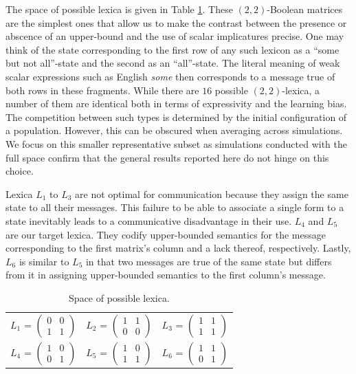 \documentclass[a4paper]{article}
\begin{document}
The space of possible lexica is given in Table \ref{tab:lexica}. These $(2,2)$-Boolean matrices are the simplest ones that allow us to make the contrast between the presence or abscence of an upper-bound and the use of scalar implicatures precise. One may think of the state corresponding to the first row of any such lexicon as a ``some but not all''-state and the second as an ``all''-state. The literal meaning of weak scalar expressions such as English {\em some} then corresponds to a message true of both rows in these fragments. While there are $16$ possible $(2,2)$-lexica, a number of them are identical both in terms of expressivity and the learning bias. The competition between such types is determined by the initial configuration of a population. However, this can be obscured when averaging across simulations. We focus on this smaller representative subset as simulations conducted with the full space confirm that the general results reported here do not hinge on this choice.

Lexica $L_1$ to $L_3$ are not optimal for communication because they assign the same state to all their messages. This failure to be able to associate a single form to a state inevitably leads to a communicative disadvantage in their use. $L_4$ and $L_5$ are our target lexica. They codify upper-bounded semantics for the message corresponding to the first matrix's column and a lack thereof, respectively. Lastly, $L_6$ is similar to $L_5$ in that two messages are true of the same state but differs from it in assigning upper-bounded semantics to the first column's message. 

\begin{table}[t]
\centering 
\begin{tabular}{l c l}
$L_1$ = $\begin{pmatrix} 0 & 0 \\ 1 & 1 \end{pmatrix}$ & 
$L_2$ = $\begin{pmatrix} 1 & 1 \\ 0 & 0 \end{pmatrix}$ & 
$L_3$ = $\begin{pmatrix} 1 & 1 \\ 1 & 1 \end{pmatrix}$\\[0.5cm]

$L_4$ = $\begin{pmatrix} 1 & 0 \\ 0 & 1 \end{pmatrix}$ &
$L_5$ = $\begin{pmatrix} 1 & 0 \\ 1 & 1 \end{pmatrix}$ &
$L_6$ = $\begin{pmatrix} 1 & 1 \\ 0 & 1 \end{pmatrix}$
\end{tabular}
\caption{Space of possible lexica.}
\label{tab:lexica}
\end{table}
\end{document}
